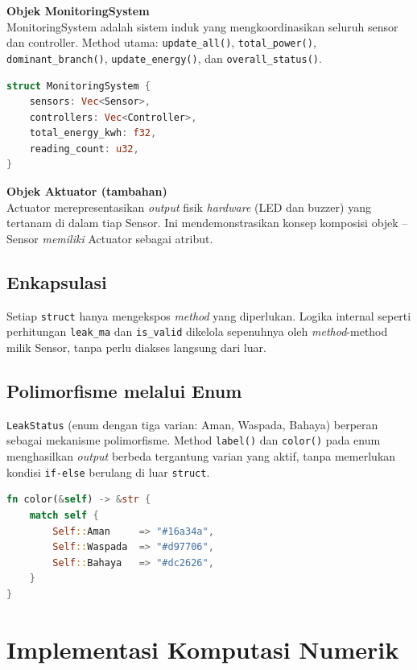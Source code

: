 \documentclass[12pt,a4paper]{article}
\begin{document}
\textbf{Objek MonitoringSystem}\\
MonitoringSystem adalah sistem induk yang mengkoordinasikan seluruh sensor dan
controller. Method utama: \texttt{update\_all()}, \texttt{total\_power()},
\texttt{dominant\_branch()}, \texttt{update\_energy()}, dan
\texttt{overall\_status()}.

\begin{lstlisting}[language=Rust, caption={Struct MonitoringSystem}]
struct MonitoringSystem {
    sensors: Vec<Sensor>,
    controllers: Vec<Controller>,
    total_energy_kwh: f32,
    reading_count: u32,
}
\end{lstlisting}

\textbf{Objek Aktuator (tambahan)}\\
Actuator merepresentasikan \emph{output} fisik \emph{hardware} (LED dan buzzer)
yang tertanam di dalam tiap Sensor. Ini mendemonstrasikan konsep komposisi objek
-- Sensor \emph{memiliki} Actuator sebagai atribut.

\subsection{Enkapsulasi}

Setiap \texttt{struct} hanya mengekspos \emph{method} yang diperlukan. Logika
internal seperti perhitungan \texttt{leak\_ma} dan \texttt{is\_valid} dikelola
sepenuhnya oleh \emph{method}-method milik Sensor, tanpa perlu diakses langsung
dari luar.

\subsection{Polimorfisme melalui Enum}

\texttt{LeakStatus} (enum dengan tiga varian: Aman, Waspada, Bahaya) berperan
sebagai mekanisme polimorfisme. Method \texttt{label()} dan \texttt{color()} pada
enum menghasilkan \emph{output} berbeda tergantung varian yang aktif, tanpa
memerlukan kondisi \texttt{if-else} berulang di luar \texttt{struct}.

\begin{lstlisting}[language=Rust, caption={Method color pada LeakStatus}]
fn color(&self) -> &str {
    match self {
        Self::Aman     => "#16a34a",
        Self::Waspada  => "#d97706",
        Self::Bahaya   => "#dc2626",
    }
}
\end{lstlisting}

\section{Implementasi Komputasi Numerik}
\end{document}
